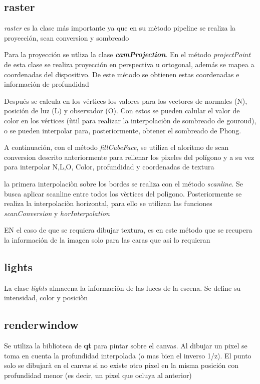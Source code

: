 \documentclass[12pt]{article}
\begin{document}
\subsection{raster}
\textit{raster} es la clase más importante ya que en su mètodo pipeline se realiza la proyección, scan conversion y sombreado

Para la proyección se utliza la clase \textit{\textbf{camProjection}}. En el método \textit{projectPoint} de esta clase se realiza proyección en perspectiva u ortogonal, además se mapea a coordenadas del dispositivo. De este método se obtienen estas coordenadas e información de profundidad

Después se calcula en los vértices los valores para los vectores de normales (N), posición de luz (L) y observador (O). Con estos se pueden calular el valor de color en los vértices (ùtil para realizar la interpolaciòn de sombreado de gouroud), o se pueden interpolar para, posteriormente, obtener el sombreado de Phong.

A continuación, con el método \textit{fillCubeFace}, se utiliza el aloritmo de scan conversion descrito anteriormente para rellenar los pixeles del polígono y a su vez para interpolar N,L,O, Color, profundidad y coordenadas de textura 

la primera interpolaciòn sobre los bordes se realiza con el método \textit{scanline}. Se busca aplicar scanline entre todos los vèrtices del polìgono. Posteriormente se realiza la interpolaciòn horizontal, para ello se utilizan las funciones \textit{scanConversion} y \textit{horInterpolation}

EN el caso de que se requiera dibujar textura, es en este método que se recupera la información de la imagen solo para las caras que asi lo requieran

\subsection{lights}
La clase \textit{lights} almacena la informaciòn de las luces de la escena. Se define su intensidad, color y posiciòn

\subsection{renderwindow}

Se utiliza la biblioteca de \textbf{qt} para pintar sobre el canvas. Al dibujar un pixel se toma en cuenta la profundidad interpolada (o mas bien el inverso 1/z).
El punto solo se dibujarà en el canvas si no existe otro pixel en la misma posición con profundidad menor (es decir, un pixel que ocluya al anterior)
\end{document}
